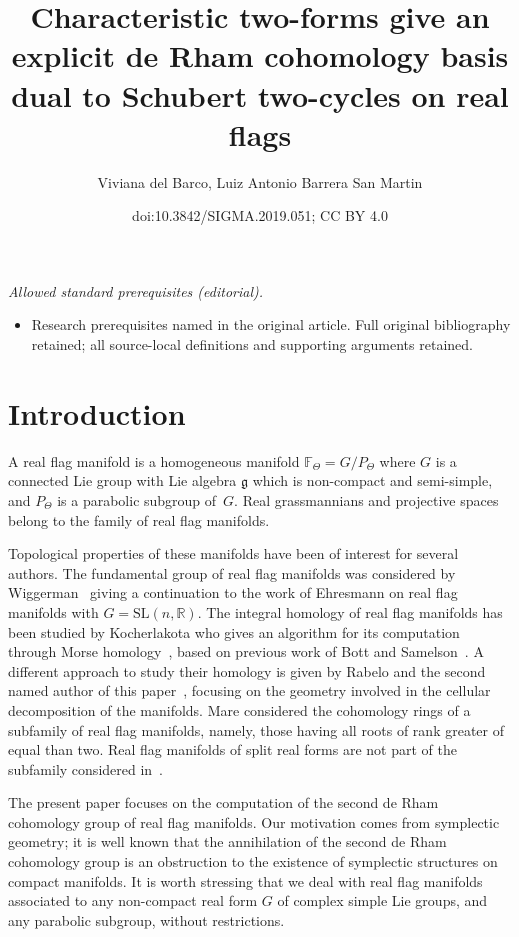 \documentclass[10pt,a4paper]{amsart}
\title{Characteristic two-forms give an explicit de Rham cohomology basis dual to Schubert two-cycles on real flags}
\author{Viviana del Barco, Luiz Antonio Barrera San Martin}
\date{doi:10.3842/SIGMA.2019.051; CC BY 4.0}
\numberwithin{equation}{section}
\begin{document}
\maketitle
\noindent\textit{Allowed standard prerequisites (editorial).}\begin{itemize}
\item Research prerequisites named in the original article. Full original bibliography retained; all source-local definitions and supporting arguments retained.
\end{itemize}\medskip
\section{Introduction}

A real flag manifold is a homogeneous manifold $\mathbb{F}_\Theta=G/P_\Theta$ where $G$ is a connected Lie group with Lie algebra $\mathfrak{g}$ which is non-compact and semi-simple, and $P_\Theta$ is a parabolic subgroup of~$G$. Real grassmannians and projective spaces belong to the family of real flag manifolds.

Topological properties of these manifolds have been of interest for several authors. The fundamental group of real flag manifolds was considered by Wiggerman~\cite{Wi} giving a continuation to the work of Ehresmann on real flag manifolds with $G=\mathrm{SL}(n,\mathbb{R})$. The integral homology of real flag manifolds has been studied by Kocherlakota who gives an algorithm for its computation through Morse homology~\cite{Ko}, based on previous work of Bott and Samelson~\cite{BS}. A different approach to study their homology is given by Rabelo and the second named author of this paper~\cite{RSM}, focusing on the geometry involved in the cellular decomposition of the manifolds. Mare \cite{Ma} considered the cohomology rings of a subfamily of real flag manifolds, namely, those having all roots of rank greater of equal than two. Real flag manifolds of split real forms are not part of the subfamily considered in~\cite{Ma}.

The present paper focuses on the computation of the second de Rham cohomology group of real flag manifolds. Our motivation comes from symplectic geometry; it is well known that the annihilation of the second de Rham cohomology group is an obstruction to the existence of symplectic structures on compact manifolds. It is worth stressing that we deal with real flag manifolds associated to any non-compact real form $G$ of complex simple Lie groups, and any parabolic subgroup, without restrictions.
\end{document}
